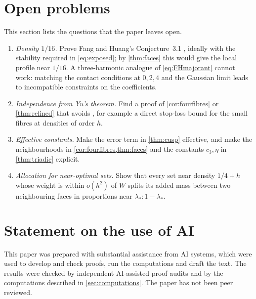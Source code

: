\documentclass[11pt,a4paper]{article}
\numberwithin{equation}{section}
\newtheorem{conjecture}[theorem]{Conjecture}
\theoremstyle{remark}
\newcommand{\E}{\mathbb E}
\begin{document}
\section{Open problems}\label{sec:open}

This section lists the questions that the paper leaves open.


\begin{enumerate}[leftmargin=2em]
\item \emph{Density $1/16$.} Prove Fang and Huang's Conjecture~3.1
 \cite{FangHuang}, ideally with the stability required in \eqref{eq:exposed};
 by \cref{thm:faces} this would give the local profile near $1/16$.
 A three-harmonic analogue of \eqref{eq:FHmajorant} cannot work: matching
 the contact conditions at $0,2,4$ and the Gaussian limit leads to
 incompatible constraints on the coefficients.
\item \emph{Independence from Yu's theorem.} Find a proof of
 \cref{cor:fourfibres} or \cref{thm:refined} that avoids
 \cite[Theorem~5]{YuLevel}, for example a direct stop-loss bound for the
 small fibres at densities of order $h$.
\item \emph{Effective constants.} Make the error term in \cref{thm:cusp}
 effective, and make the neighbourhoods in
 \cref{cor:fourfibres,thm:faces} and the constants $c_3,\eta$ in
 \cref{thm:triadic} explicit.
\item \emph{Allocation for near-optimal sets.} Show that every set near
 density $1/4+h$ whose weight is within $o(h^2)$ of $W$ splits its added
 mass between two neighbouring faces in proportions near
 $\lambda_*:1-\lambda_*$.
\end{enumerate}

\section*{Statement on the use of AI}
This paper was prepared with substantial assistance from AI systems, which
were used to develop and check proofs, run the computations and draft the
text. The results were checked by independent AI-assisted proof audits
and by the computations described in \cref{sec:computations}. The paper has
not been peer reviewed.
\end{document}
